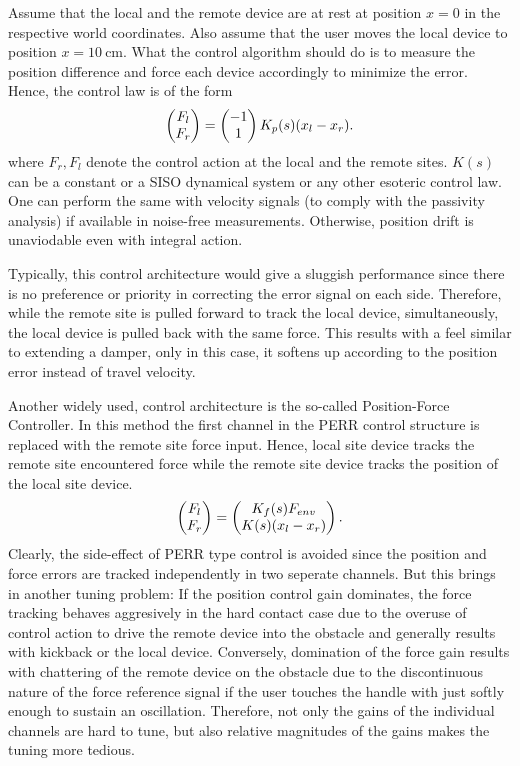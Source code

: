 Assume that the local and the remote device are at rest at position $x=0$ in the respective world coordinates. 
Also assume that the user moves the local device to position $x=\SI{10}{\centi\metre}$. What the control algorithm
should do is to measure the position difference and force each device accordingly to minimize the error. Hence, the
control law is of the form
\[
\begin{pmatrix}F_l\\F_r\end{pmatrix} = \begin{pmatrix}-1\\1\end{pmatrix} K_p(s) (x_l-x_r).
\]
where $F_r,F_l$ denote the control action at the local and the remote sites. $K(s)$ can be a constant or a SISO dynamical 
system or any other esoteric control law. One can perform the same with velocity signals (to comply with the passivity 
analysis) if available in noise-free measurements. Otherwise, position drift is unaviodable even with integral action. 

Typically, this control architecture would give a sluggish performance since there is no preference or priority in 
correcting the error signal on each side. Therefore, while the remote site is pulled forward to track the local device,
simultaneously, the local device is pulled back with the same force. This results with a feel similar to extending a 
damper, only in this case, it softens up according to the position error instead of travel velocity.

Another widely used, control architecture is the so-called Position-Force Controller. In this method the first channel 
in the PERR control structure is replaced with the remote site force input. Hence, local site device tracks the remote site 
encountered force while the remote site device tracks the position of the local site device. 
\[
\begin{pmatrix}F_l\\F_r\end{pmatrix} = \begin{pmatrix}K_f(s)F_{env} \\ K(s) (x_l-x_r)\end{pmatrix}.
\]
Clearly, the side-effect of PERR type control is avoided since the position and force errors are tracked independently 
in two seperate channels. But this brings in another tuning problem: If the position control gain dominates, the force tracking 
behaves aggresively in the hard contact case due to the overuse of control action to drive the remote device into the obstacle
and generally results with kickback or the local device. Conversely, domination of the force gain results with chattering of 
the remote device on the obstacle due to the discontinuous nature of the force reference signal if the user touches the handle 
with just softly enough to sustain an oscillation. Therefore, not only the gains of the individual channels are hard to tune, but
also relative magnitudes of the gains makes the tuning more tedious.

